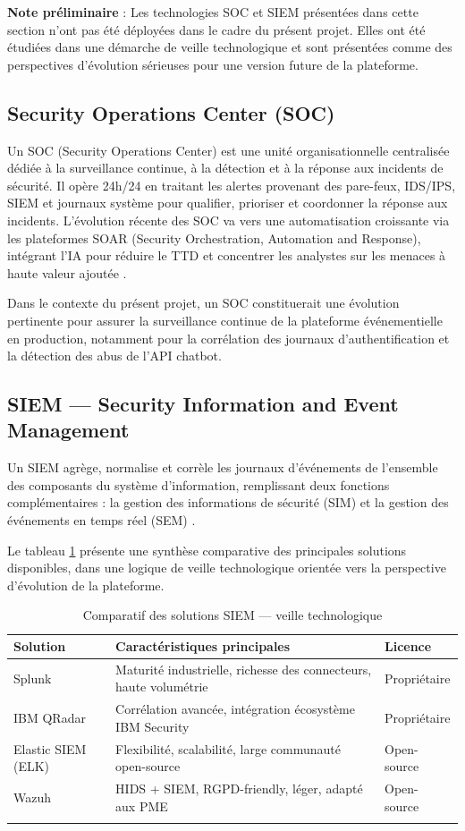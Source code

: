 \textbf{Note préliminaire} : Les technologies SOC et SIEM présentées dans cette section n'ont pas été déployées dans le cadre du présent projet. Elles ont été étudiées dans une démarche de veille technologique et sont présentées comme des perspectives d'évolution sérieuses pour une version future de la plateforme.

\subsection{Security Operations Center (SOC)}
Un SOC (Security Operations Center) est une unité organisationnelle centralisée dédiée à la surveillance continue, à la détection et à la réponse aux incidents de sécurité. Il opère 24h/24 en traitant les alertes provenant des pare-feux, IDS/IPS, SIEM et journaux système pour qualifier, prioriser et coordonner la réponse aux incidents. L'évolution récente des SOC va vers une automatisation croissante via les plateformes SOAR (Security Orchestration, Automation and Response), intégrant l'IA pour réduire le TTD et concentrer les analystes sur les menaces à haute valeur ajoutée \cite{nist}.

Dans le contexte du présent projet, un SOC constituerait une évolution pertinente pour assurer la surveillance continue de la plateforme événementielle en production, notamment pour la corrélation des journaux d'authentification et la détection des abus de l'API chatbot.

\subsection{SIEM — Security Information and Event Management}
Un SIEM agrège, normalise et corrèle les journaux d'événements de l'ensemble des composants du système d'information, remplissant deux fonctions complémentaires : la gestion des informations de sécurité (SIM) et la gestion des événements en temps réel (SEM) \cite{nist}.

Le tableau \ref{tab:siem} présente une synthèse comparative des principales solutions disponibles, dans une logique de veille technologique orientée vers la perspective d'évolution de la plateforme.

\begin{longtable}{|m{4cm}|m{6cm}|m{3cm}|}
\hline
\textbf{Solution} & \textbf{Caractéristiques principales} & \textbf{Licence} \\
\hline
\endhead
\endfoot
\endlastfoot
\hline
Splunk & Maturité industrielle, richesse des connecteurs, haute volumétrie & Propriétaire \\
\hline
IBM QRadar & Corrélation avancée, intégration écosystème IBM Security & Propriétaire \\
\hline
Elastic SIEM (ELK) & Flexibilité, scalabilité, large communauté open-source & Open-source \\
\hline
Wazuh & HIDS + SIEM, RGPD-friendly, léger, adapté aux PME & Open-source \\
\hline
\captionsetup{justification=centering,margin=2cm}
\caption{Comparatif des solutions SIEM — veille technologique}
\label{tab:siem}
\end{longtable}

